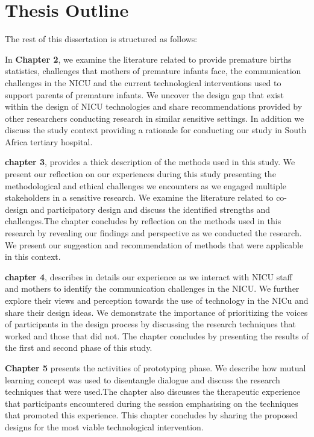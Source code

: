 \section{Thesis Outline}
The rest of this dissertation is structured as follows:

In \textbf{Chapter 2}, we examine the literature related to provide premature births statistics, challenges that mothers of premature infants face, the communication challenges in the NICU and the current technological interventions used to support parents of premature infants. We uncover the design gap that exist within the design of NICU technologies and share recommendations provided by other researchers conducting research in similar sensitive settings. In addition we discuss the study context providing a rationale for conducting our study in South Africa tertiary hospital.

 \textbf{chapter 3}, provides a thick description of the methods used in this study. We present our reflection on our experiences during this study presenting the methodological and ethical challenges we encounters as we engaged multiple stakeholders in a sensitive research. We examine the literature related to co-design and participatory design and discuss the identified strengths and challenges.The chapter concludes by reflection on the methods used in this research by revealing our findings and perspective as we conducted the research. We present our suggestion and recommendation of methods that were applicable in this context.

 \textbf{chapter 4}, describes in details our experience as we interact with  NICU staff and mothers to identify the communication challenges in the NICU. We further explore their views and perception towards the use of technology in the NICu and share their design ideas. We demonstrate the importance of prioritizing the voices of participants in the design process by discussing the research techniques that worked and those that did not. The chapter concludes by presenting the results of the first and second phase of this study.
 
 \textbf{Chapter 5} presents the activities of prototyping phase. We describe how mutual learning concept was used to disentangle dialogue and discuss the research techniques that were used.The chapter also discusses the therapeutic experience that participants encountered during the session emphasising on the techniques that promoted this experience. This chapter concludes by sharing the proposed designs for the most viable technological intervention.
 
